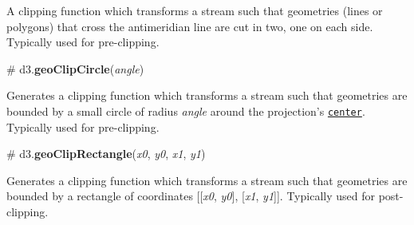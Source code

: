 A clipping function which transforms a stream such that geometries (lines or polygons) that cross the antimeridian line are cut in two, one on each side. Typically used for pre-\/clipping.

\label{_geoClipCircle}%
\# d3.{\bfseries geo\+Clip\+Circle}({\itshape angle})

Generates a clipping function which transforms a stream such that geometries are bounded by a small circle of radius {\itshape angle} around the projection’s \href{#projection_center}{\tt center}. Typically used for pre-\/clipping.

\label{_geoClipRectangle}%
\# d3.{\bfseries geo\+Clip\+Rectangle}({\itshape x0}, {\itshape y0}, {\itshape x1}, {\itshape y1})

Generates a clipping function which transforms a stream such that geometries are bounded by a rectangle of coordinates \mbox{[}\mbox{[}{\itshape x0}, {\itshape y0}\mbox{]}, \mbox{[}{\itshape x1}, {\itshape y1}\mbox{]}\mbox{]}. Typically used for post-\/clipping. 